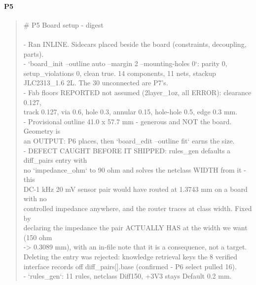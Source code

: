 \documentclass[11pt,a4paper]{article}
\begin{document}
\paragraph*{P5}
\begin{quote}\small\ttfamily\raggedright
\# P5 Board setup - digest\\
~\\
- Ran INLINE. Sidecars placed beside the board (constraints, decoupling, parts).\\
- `board\_init --outline auto --margin 2 --mounting-holes 0`: parity 0,\\
  setup\_violations 0, clean true. 14 components, 11 nets, stackup\\
  JLC2313\_1.6 2L. The 30 unconnected are P7's.\\
- Fab floors REPORTED not assumed (2layer\_1oz, all ERROR): clearance 0.127,\\
  track 0.127, via 0.6, hole 0.3, annular 0.15, hole-hole 0.5, edge 0.3 mm.\\
- Provisional outline 41.0 x 57.7 mm - generous and NOT the board. Geometry is\\
  an OUTPUT: P6 places, then `board\_edit --outline fit` earns the size.\\
- DEFECT CAUGHT BEFORE IT SHIPPED: rules\_gen defaults a diff\_pairs entry with\\
  no `impedance\_ohm` to 90 ohm and solves the netclass WIDTH from it - this\\
  DC-1 kHz 20 mV sensor pair would have routed at 1.3743 mm on a board with no\\
  controlled impedance anywhere, and the router traces at class width. Fixed by\\
  declaring the impedance the pair ACTUALLY HAS at the width we want (150 ohm\\
  -\textgreater{} 0.3089 mm), with an in-file note that it is a consequence, not a target.\\
  Deleting the entry was rejected: knowledge retrieval keys the 8 verified\\
  interface records off diff\_pairs{[}{]}.base (confirmed - P6 select pulled 16).\\
- `rules\_gen`: 11 rules, netclass Diff150, +3V3 stays Default 0.2 mm.
\end{quote}
\end{document}
